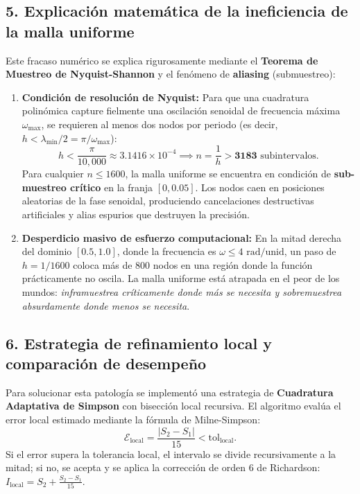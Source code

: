 \documentclass[11pt,a4paper]{article}
\begin{document}
\subsection{5. Explicación matemática de la ineficiencia de la malla uniforme}
Este fracaso numérico se explica rigurosamente mediante el \textbf{Teorema de Muestreo de Nyquist-Shannon} y el fenómeno de \textbf{aliasing} (submuestreo):

\begin{enumerate}[leftmargin=*]
    \item \textbf{Condición de resolución de Nyquist:} Para que una cuadratura polinómica capture fielmente una oscilación senoidal de frecuencia máxima $\omega_{\max}$, se requieren al menos dos nodos por periodo (es decir, $h < \lambda_{\min} / 2 = \pi / \omega_{\max}$):
    \begin{equation}
        h < \frac{\pi}{10{,}000} \approx 3.1416 \times 10^{-4} \implies n = \frac{1}{h} > \mathbf{3183} \text{ subintervalos}.
    \end{equation}
    Para cualquier $n \le 1600$, la malla uniforme se encuentra en condición de \textbf{sub-muestreo crítico} en la franja $[0, 0.05]$. Los nodos caen en posiciones aleatorias de la fase senoidal, produciendo cancelaciones destructivas artificiales y alias espurios que destruyen la precisión.

    \item \textbf{Desperdicio masivo de esfuerzo computacional:}
    En la mitad derecha del dominio $[0.5, 1.0]$, donde la frecuencia es $\omega \le 4\text{ rad/unid}$, un paso de $h = 1/1600$ coloca más de 800 nodos en una región donde la función prácticamente no oscila. La malla uniforme está atrapada en el peor de los mundos: \textit{inframuestrea críticamente donde más se necesita y sobremuestrea absurdamente donde menos se necesita}.
\end{enumerate}

\subsection{6. Estrategia de refinamiento local y comparación de desempeño}
Para solucionar esta patología se implementó una estrategia de \textbf{Cuadratura Adaptativa de Simpson} con bisección local recursiva. El algoritmo evalúa el error local estimado mediante la fórmula de Milne-Simpson:
\begin{equation}
    \mathcal{E}_{\text{local}} = \frac{|S_2 - S_1|}{15} < \mathrm{tol}_{\text{local}}.
\end{equation}
Si el error supera la tolerancia local, el intervalo se divide recursivamente a la mitad; si no, se acepta y se aplica la corrección de orden 6 de Richardson: $I_{\text{local}} = S_2 + \frac{S_2 - S_1}{15}$.
\end{document}
